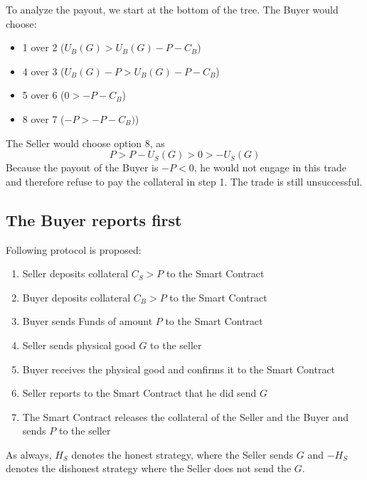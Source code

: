 \documentclass{cacthesis}
\begin{document}
To analyze the payout, we start at the bottom of the tree. The Buyer would choose:
\begin{itemize}
    \item 1 over 2 ($U_B(G) > U_B(G) -P -C_B$)
    \item 4 over 3 ($U_B(G) - P > U_B(G) -P -C_B$)
    \item 5 over 6 ($0 > -P -C_B$)
    \item 8 over 7 ($-P > -P -C_B)$)
\end{itemize}
The Seller would choose option 8, as 
\[P>P-U_S(G)>0>-U_S(G)\]
Because the payout of the Buyer is $-P<0$, he would not engage in this trade and therefore refuse to pay the collateral in step 1. The trade is still unsuccessful.

\subsection{The Buyer reports first}
Following protocol is proposed:
\begin{enumerate}
    \item Seller deposits collateral $C_S > P$ to the Smart Contract
    \item Buyer deposits collateral $C_B > P$ to the Smart Contract
    \item Buyer sends Funds of amount $P$ to the Smart Contract
    \item Seller sends physical good $G$ to the seller
    \item Buyer receives the physical good and confirms it to the Smart Contract
    \item Seller reports to the Smart Contract that he did send $G$
    \item The Smart Contract releases the collateral of the Seller and the Buyer and sends $P$ to the seller
\end{enumerate}
As always, $H_S$ denotes the honest strategy, where the Seller sends $G$ and $-H_S$ denotes the dishonest strategy where the Seller does not send the $G$.
\end{document}
